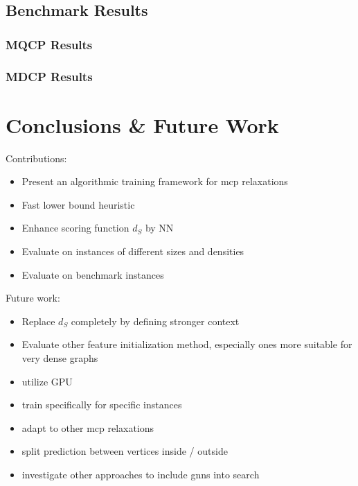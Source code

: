\documentclass[draft,final]{vutinfth} %
\begin{document}
\section{Benchmark Results}

\subsection{MQCP Results}
\subsection{MDCP Results}





\chapter{Conclusions \& Future Work}\label{chp:conclusions}

Contributions:
\begin{itemize}
    \item Present an algorithmic training framework for mcp relaxations
    \item Fast lower bound heuristic
    \item Enhance scoring function $d_S$ by NN 
    \item Evaluate on instances of different sizes and densities
    \item Evaluate on benchmark instances
\end{itemize}

Future work:
\begin{itemize}
    \item Replace $d_S$ completely by defining stronger context
    \item Evaluate other feature initialization method, especially ones more suitable for very dense graphs
    \item utilize GPU
    \item train specifically for specific instances
    \item adapt to other mcp relaxations
    \item split prediction between vertices inside / outside 
    \item investigate other approaches to include gnns into search 
\end{itemize}

\backmatter

\listoffigures %

\cleardoublepage %
\listoftables %

\listofalgorithms
{}

\printindex

\printglossaries



\end{document}
